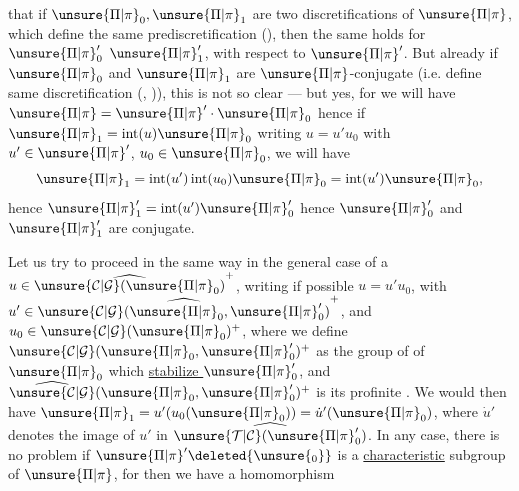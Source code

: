 that  if $\unsure{\Pi|\pi}_0,\unsure{\Pi|\pi}_1$ are two discretifications  of $\unsure{\Pi|\pi}$, which define the same prediscretification (), then the same holds for  $\unsure{\Pi|\pi}'_0$  $\unsure{\Pi|\pi}'_1$, with respect to $\unsure{\Pi|\pi}'$. But already if $\unsure{\Pi|\pi}_0$ and $\unsure{\Pi|\pi}_1$ are $\unsure{\Pi|\pi}$-conjugate (i.e. define same discretification (, \uline{})), this is not so clear ---  but yes, for we will have $\unsure{\Pi|\pi}=\unsure{\Pi|\pi}'\cdot\unsure{\Pi|\pi}_0$ hence if $\unsure{\Pi|\pi}_1=\operatorname{int}(u)\unsure{\Pi|\pi}_0$ writing $u=u'u_0$ with $u'\in\unsure{\Pi|\pi}'$, $u_0\in\unsure{\Pi|\pi}_0$, we will have
\[
\unsure{\Pi|\pi}_1=\operatorname{int}(u')\operatorname{int}(u_0)\unsure{\Pi|\pi}_0=\operatorname{int}(u')\unsure{\Pi|\pi}_0,
\]
hence $\unsure{\Pi|\pi}'_1=\operatorname{int}(u')\unsure{\Pi|\pi}'_0$ hence $\unsure{\Pi|\pi}'_0$ and $\unsure{\Pi|\pi}'_1$ are conjugate.

Let us try to proceed in the same way in the general case of a $u\in\widehat{\unsure{\mathcal{C}|\mathcal{G}}(\unsure{\Pi|\pi}_0)}^+$,  writing if possible $u=u'u_0$, with $u'\in\widehat{\unsure{\mathcal{C}|\mathcal{G}}(\unsure{\Pi|\pi}_0,\unsure{\Pi|\pi}'_0)}^+$, and $u_0\in\unsure{\mathcal{C}|\mathcal{G}}(\unsure{\Pi|\pi}_0)^+$, where we define $\unsure{\mathcal{C}|\mathcal{G}}(\unsure{\Pi|\pi}_0,\unsure{\Pi|\pi}'_0)^+$ as the group of   of $\unsure{\Pi|\pi}_0$ which \uline{stabilize $\unsure{\Pi|\pi}'_0$}, and $\widehat{\unsure{\mathcal{C}|\mathcal{G}}}(\unsure{\Pi|\pi}_0,\unsure{\Pi|\pi}'_0)^+$ is its profinite . We would then have $\unsure{\Pi|\pi}_1=u'(u_0(\unsure{\Pi|\pi}_0))=\dot{u}'(\unsure{\Pi|\pi}_0)$, where  $\dot{u}'$ denotes the image of $u'$ in $\widehat{\unsure{\mathcal{T}|\mathcal{C}}(\unsure{\Pi|\pi}'_0)}$. In any case, there is no problem if $\unsure{\Pi|\pi}'\deleted{\unsure{_0}}$ is a  \uline{characteristic} subgroup of $\unsure{\Pi|\pi}$, for then we have a homomorphism

